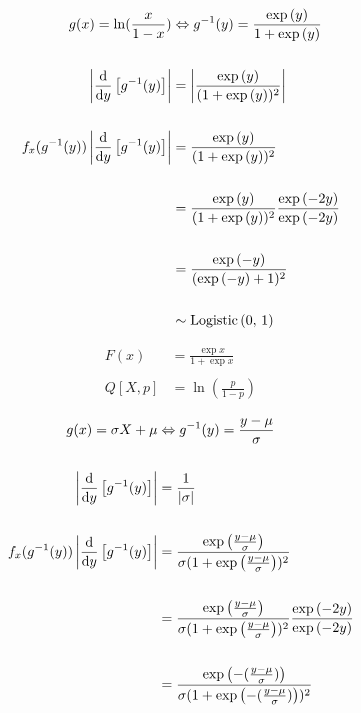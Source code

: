 \documentclass[12pt]{article}
\begin{document}
\begin{enumerate}
\begin{align*}
    g(x) = \ln(\frac{x}{1-x}) &\Leftrightarrow  g^{-1}(y) = \frac{\mathrm{exp}\left(y\right)}{1 + \mathrm{exp}\left(y\right)} \\ \\ 
    \left|\dfrac{\text{d}}{\text{d} y}\left[g^{-1}(y)\right]\right| &= \left|\frac{\mathrm{exp}\left(y\right)}{(1 + \mathrm{exp}\left(y\right))^2}\right| \\ \\ 
    f_x(g^{-1}(y)) \left|\dfrac{\text{d}}{\text{d} y}\left[g^{-1}(y)\right]\right| &= \frac{\mathrm{exp}\left(y\right)}{(1 + \mathrm{exp}\left(y\right))^2} \\ \\
    &= \frac{\mathrm{exp}\left(y\right)}{(1 + \mathrm{exp}\left(y\right))^2} \frac{\mathrm{exp}\left(-2y\right)}{\mathrm{exp}\left(-2y\right)} \\ \\ 
    &= \frac{\mathrm{exp}\left(-y\right)}{(\mathrm{exp}\left(-y\right) + 1)^2} \\ \\ 
    &\sim \mathrm{Logistic}\left(0,\,1\right)
\end{align*}



\begin{align*}
    F(x) &= \frac{\exp{x}}{1 + \exp{x}} \\ \\ 
    Q[X, p] &= \ln(\frac{p}{1-p}) 
\end{align*}


\begin{align*}
    g(x) = \sigma X + \mu  &\Leftrightarrow  g^{-1}(y) =  \frac{y - \mu}{\sigma}\\ \\
    \left|\dfrac{\text{d}}{\text{d} y}\left[g^{-1}(y)\right]\right| &= \frac{1}{\left|\sigma\right|} \\ \\ 
    f_x(g^{-1}(y)) \left|\dfrac{\text{d}}{\text{d} y}\left[g^{-1}(y)\right]\right| &= \frac{\mathrm{exp}\left(\frac{y - \mu}{\sigma}\right)}{\sigma (1 + \mathrm{exp}\left(\frac{y - \mu}{\sigma}\right))^2} \\ \\ 
    &= \frac{\mathrm{exp}\left(\frac{y - \mu}{\sigma}\right)}{\sigma (1 + \mathrm{exp}\left(\frac{y - \mu}{\sigma}\right))^2} \frac{\mathrm{exp}\left(-2y\right)}{\mathrm{exp}\left(-2y\right)} \\ \\ 
    &= \frac{\mathrm{exp}\left(-(\frac{y - \mu}{\sigma})\right)}{\sigma (1 + \mathrm{exp}\left(-(\frac{y - \mu}{\sigma})\right))^2}
\end{align*} 



\end{enumerate}
\end{document}
